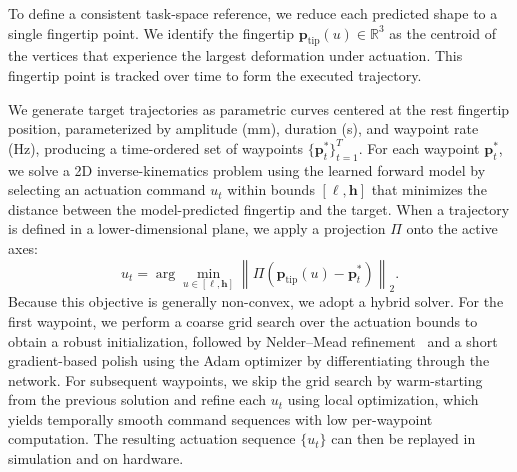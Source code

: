 \documentclass[letterpaper, 10 pt, conference]{ieeeconf}  %
\begin{document}
To define a consistent task-space reference, we reduce each predicted shape to a single fingertip point. We identify the fingertip $\mathbf{p}_{\text{tip}}(u)\in\mathbb{R}^3$ as the centroid of the vertices that experience the largest deformation under actuation. This fingertip point is tracked over time to form the executed trajectory.

We generate target trajectories as parametric curves centered at the rest fingertip position, parameterized by amplitude (mm), duration (s), and waypoint rate (Hz), producing a time-ordered set of waypoints $\{\mathbf{p}^*_t\}_{t=1}^{T}$. For each waypoint $\mathbf{p}^*_t$, we solve a 2D inverse-kinematics problem using the learned forward model by selecting an actuation command $u_t$ within bounds $[\boldsymbol{\ell},\mathbf{h}]$ that minimizes the distance between the model-predicted fingertip and the target. When a trajectory is defined in a lower-dimensional plane, we apply a projection $\Pi$ onto the active axes:
\[
u_t=\arg\min_{u\in[\boldsymbol{\ell},\mathbf{h}]}\left\lVert \Pi\!\left(\mathbf{p}_{\text{tip}}(u)-\mathbf{p}^*_t\right)\right\rVert_2.
\]
Because this objective is generally non-convex, we adopt a hybrid solver. For the first waypoint, we perform a coarse grid search over the actuation bounds to obtain a robust initialization, followed by Nelder–Mead refinement~\cite{Nelder1965ASM} and a short gradient-based polish using the Adam optimizer by differentiating through the network. For subsequent waypoints, we skip the grid search by warm-starting from the previous solution and refine each $u_t$ using local optimization, which yields temporally smooth command sequences with low per-waypoint computation. The resulting actuation sequence $\{u_t\}$ can then be replayed in simulation and on hardware.
\end{document}
